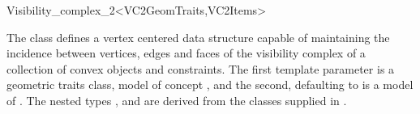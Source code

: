 
\ccRefPageBegin

\begin{ccRefClass}{Visibility_complex_2<VC2GeomTraits,VC2Items>}

\ccDefinition
  
The class \ccRefName{} defines a vertex centered data structure capable of
maintaining the incidence between vertices, edges and faces of the
visibility complex of a collection of convex objects and constraints. The
first template parameter is a geometric traits class, model of concept
, and the second, defaulting to
 is a model of . The nested
types ,  and  are derived from the classes
supplied in .


\ccTypes
{}


\end{ccRefClass}
